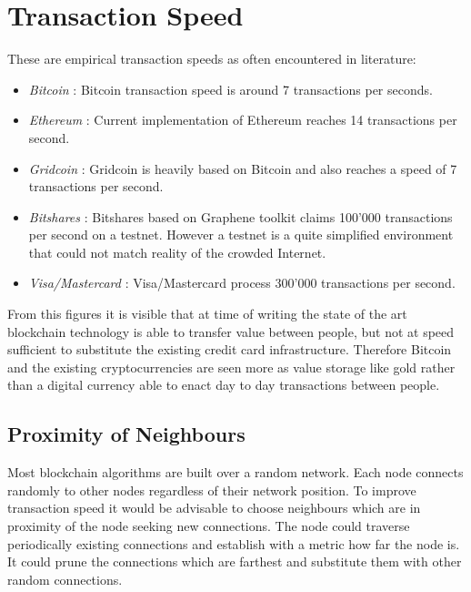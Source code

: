 \section{Transaction Speed}

These are empirical transaction speeds as often encountered in literature:

\begin{itemize}
  \item {\em Bitcoin } : Bitcoin transaction speed is around 7 transactions per seconds.
  \item {\em Ethereum } : Current implementation of Ethereum reaches 14 transactions per second.
  \item {\em Gridcoin } : Gridcoin is heavily based on Bitcoin and also reaches a speed of 7 transactions per second.
  \item {\em Bitshares } : Bitshares based on Graphene toolkit claims 100'000 transactions per second on a testnet. However a testnet is a quite simplified environment that could not match reality of the crowded Internet.
  \item {\em Visa/Mastercard } : Visa/Mastercard process 300'000 transactions per second.
\end{itemize}

From this figures it is visible that at time of writing the state of the art blockchain technology is able to transfer value between people, but not at speed sufficient to substitute the existing credit card infrastructure. Therefore Bitcoin and the existing cryptocurrencies are seen more as value storage like gold rather than a digital currency able to enact day to day transactions between people.\\


\subsection{Proximity of Neighbours}

Most blockchain algorithms are built over a random network. Each node connects randomly to other nodes regardless of their network position. To improve transaction speed it would be advisable to choose neighbours which are in proximity of the node seeking new connections.  The node could traverse periodically existing connections and establish with a metric how far the node is. It could prune the connections which are farthest and substitute them with other random connections.

